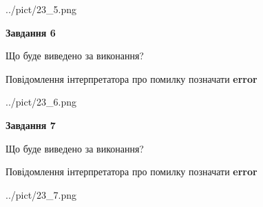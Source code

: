 \documentclass[10pt, ukrainian]{article}
\begin{document}
{\begin {large}
\begin{center}
	{../pict/23_5.png}
\end{center}
\newpage

{\begin {center}\textbf{Завдання 6}\end {center}}\par
Що буде виведено за виконання? \par
Повідомлення інтерпретатора про помилку позначати \textbf{error}

\begin{center}
	{../pict/23_6.png}
\end{center}
\newpage

{\begin {center}\textbf{Завдання 7}\end {center}}\par
Що буде виведено за виконання? \par
Повідомлення інтерпретатора про помилку позначати \textbf{error}

\begin{center}
	{../pict/23_7.png}
\end{center}
\newpage

\end {large}}
\end{document}
